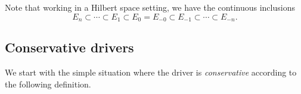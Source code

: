 \documentclass[11pt,a4paper]{amsart}
\theoremstyle{plain}%
\theoremstyle{definition}
\theoremstyle{remark}
\numberwithin{equation}{section} %
\begin{document}
\smallskip

Note that working in a Hilbert space setting, we have the continuous inclusions
\begin{equation}
\label{EqDoubleInclusion}
E_n\subset \cdots \subset E_1\subset E_0 = E_{-0}\subset E_{-1}\subset \cdots\subset E_{-n}.
\end{equation}

\medskip

\subsection{Conservative drivers}
\label{SubsectionIntegrationConservative}

We start with the simple situation where the driver is \emph{conservative} according to the following definition.
\end{document}
